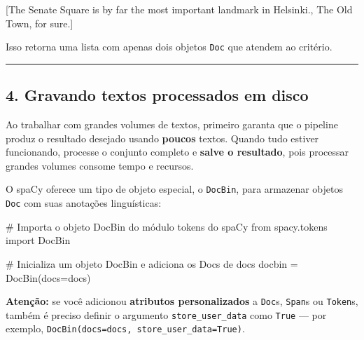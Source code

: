 \documentclass[
  brazilian,
  11pt,
]{article}
\newenvironment{Shaded}{\begin{snugshade}}{\end{snugshade}}
\newcommand{\CommentTok}[1]{\textcolor[rgb]{0.48,0.49,0.49}{#1}}
\newcommand{\ImportTok}[1]{\textcolor[rgb]{0.15,0.68,0.38}{#1}}
\newcommand{\NormalTok}[1]{\textcolor[rgb]{0.81,0.81,0.76}{#1}}
\newcommand{\OperatorTok}[1]{\textcolor[rgb]{0.81,0.81,0.76}{#1}}
\let\oldtexttt\texttt
\renewcommand{\texttt}[1]{{\color{inlink}\oldtexttt{#1}}}
\begin{document}
\begin{Shaded}
\begin{Highlighting}[]
\NormalTok{[The Senate Square is by far the most important landmark in Helsinki.,}
\NormalTok{ The Old Town, for sure.]}
\end{Highlighting}
\end{Shaded}

Isso retorna uma lista com apenas dois objetos \texttt{Doc} que atendem
ao critério.

\begin{center}\rule{0.5\linewidth}{0.5pt}\end{center}

\subsection{4. Gravando textos processados em
disco}\label{gravando-textos-processados-em-disco}

Ao trabalhar com grandes volumes de textos, primeiro garanta que o
pipeline produz o resultado desejado usando \textbf{poucos} textos.
Quando tudo estiver funcionando, processe o conjunto completo e
\textbf{salve o resultado}, pois processar grandes volumes consome tempo
e recursos.

O spaCy oferece um tipo de objeto especial, o \texttt{DocBin}, para
armazenar objetos \texttt{Doc} com suas anotações linguísticas:

\begin{Shaded}
\begin{Highlighting}[]
\CommentTok{\# Importa o objeto DocBin do módulo \textquotesingle{}tokens\textquotesingle{} do spaCy}
\ImportTok{from}\NormalTok{ spacy.tokens }\ImportTok{import}\NormalTok{ DocBin}

\CommentTok{\# Inicializa um objeto DocBin e adiciona os Docs de \textquotesingle{}docs\textquotesingle{}}
\NormalTok{docbin }\OperatorTok{=}\NormalTok{ DocBin(docs}\OperatorTok{=}\NormalTok{docs)}
\end{Highlighting}
\end{Shaded}

\begin{warnbox}

\textbf{Atenção:} se você adicionou \textbf{atributos personalizados} a
\texttt{Doc}s, \texttt{Span}s ou \texttt{Token}s, também é preciso
definir o argumento \texttt{store\_user\_data} como \texttt{True} ---
por exemplo, \texttt{DocBin(docs=docs,\ store\_user\_data=True)}.

\end{warnbox}
\end{document}
